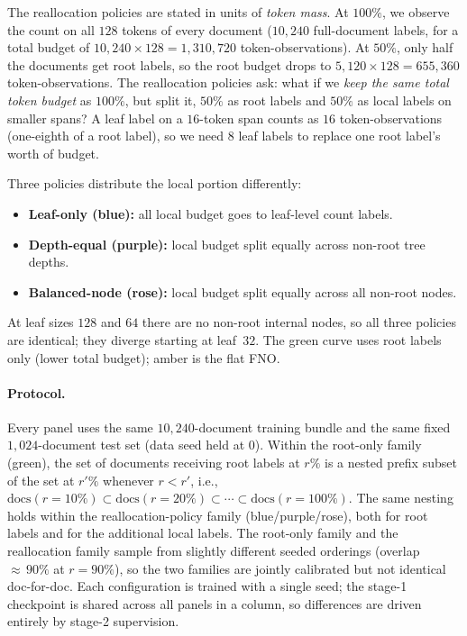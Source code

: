 The reallocation policies are stated in units of \emph{token mass}. At $100\%$, we observe the count on all $128$ tokens of every document ($10{,}240$ full-document labels, for a total budget of $10{,}240 \times 128 = 1{,}310{,}720$ token-observations). At $50\%$, only half the documents get root labels, so the root budget drops to $5{,}120 \times 128 = 655{,}360$ token-observations. The reallocation policies ask: what if we \emph{keep the same total token budget} as $100\%$, but split it, $50\%$ as root labels and $50\%$ as local labels on smaller spans? A leaf label on a $16$-token span counts as $16$ token-observations (one-eighth of a root label), so we need $8$ leaf labels to replace one root label's worth of budget.

Three policies distribute the local portion differently:
\begin{itemize}[leftmargin=1.5em]
    \item \textbf{Leaf-only (blue):} all local budget goes to leaf-level count labels.
    \item \textbf{Depth-equal (purple):} local budget split equally across non-root tree depths.
    \item \textbf{Balanced-node (rose):} local budget split equally across all non-root nodes.
\end{itemize}
At leaf sizes $128$ and $64$ there are no non-root internal nodes, so all three policies are identical; they diverge starting at leaf~$32$. The green curve uses root labels only (lower total budget); amber is the flat FNO.

\paragraph{Protocol.}
Every panel uses the same $10{,}240$-document training bundle and the same fixed $1{,}024$-document test set (data seed held at $0$). Within the root-only family (green), the set of documents receiving root labels at $r\%$ is a nested prefix subset of the set at $r'\%$ whenever $r<r'$, i.e., $\mathrm{docs}(r{=}10\%)\subset\mathrm{docs}(r{=}20\%)\subset\cdots\subset\mathrm{docs}(r{=}100\%)$. The same nesting holds within the reallocation-policy family (blue/purple/rose), both for root labels and for the additional local labels. The root-only family and the reallocation family sample from slightly different seeded orderings (overlap ${\approx}\,90\%$ at $r{=}90\%$), so the two families are jointly calibrated but not identical doc-for-doc. Each configuration is trained with a single seed; the stage-1 checkpoint is shared across all panels in a column, so differences are driven entirely by stage-2 supervision.

